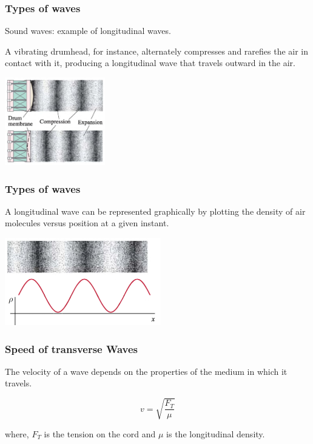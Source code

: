 \documentclass[]{beamer}
\begin{document}
\begin{frame}
\frametitle{Types of waves}

Sound waves: example of longitudinal waves.
\pause

\vspace{5mm}

 A vibrating drumhead, for instance, alternately compresses and rarefies the air in contact with it,
producing a longitudinal wave that travels outward in the air. 
\pause
 \begin{center}
  \includegraphics[height=1.5in]{images4/5.jpg}
\end{center}

  \end{frame}


\begin{frame}
\frametitle{Types of waves}

A longitudinal wave can be represented graphically by plotting the density of
air molecules versus position at a given instant.
\pause

 \begin{center}
  \includegraphics[height=1.5in]{images4/4.jpg}
\end{center}

  \end{frame}



\begin{frame}
\frametitle{Speed of transverse Waves}
The velocity of a wave depends on the properties of the medium in which it travels.
\pause

\begin{equation}
v=\sqrt{\frac{F_T}{\mu}}
\end{equation}
\pause

where, $F_T$ is the tension on the cord and $\mu$ is the longitudinal density.


  \end{frame}
\end{document}
